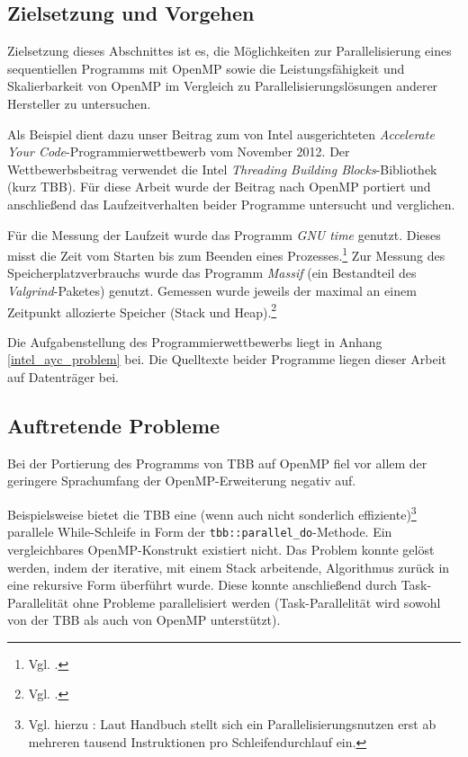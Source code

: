 \documentclass[11pt]{scrartcl}
\begin{document}
\subsection{Zielsetzung und Vorgehen}

Zielsetzung dieses Abschnittes ist es, die Möglichkeiten zur Parallelisierung eines sequentiellen Programms mit OpenMP
sowie die Leistungsfähigkeit und Skalierbarkeit von OpenMP im Vergleich zu Parallelisierungslösungen anderer Hersteller
zu untersuchen.

Als Beispiel dient dazu unser Beitrag zum von Intel ausgerichteten \emph{Accelerate Your Code}-Programmierwettbewerb vom
November 2012. Der Wettbewerbsbeitrag verwendet die Intel \emph{Threading Building Blocks}-Bibliothek (kurz TBB). Für
diese Arbeit wurde der Beitrag nach OpenMP portiert und anschließend das Laufzeitverhalten beider Programme untersucht
und verglichen.

Für die Messung der Laufzeit wurde das Programm \emph{GNU time} genutzt. Dieses misst die Zeit vom Starten bis zum Beenden eines Prozesses.\footnote{Vgl. \cite{time_man_2012}.}
Zur Messung des Speicherplatzverbrauchs wurde das Programm \emph{Massif} (ein Bestandteil des \emph{Valgrind}-Paketes) genutzt. Gemessen wurde jeweils der maximal an einem Zeitpunkt allozierte Speicher (Stack und Heap).\footnote{Vgl. \cite[S. 136ff.]{valgrind_2012}.}

Die Aufgabenstellung des Programmierwettbewerbs liegt in Anhang \ref{intel_ayc_problem} bei. Die Quelltexte beider
Programme liegen dieser Arbeit auf Datenträger bei.

\subsection{Auftretende Probleme}

Bei der Portierung des Programms von TBB auf OpenMP fiel vor allem der geringere Sprachumfang der OpenMP-Erweiterung
negativ auf.

Beispielsweise bietet die TBB eine (wenn auch nicht sonderlich effiziente)\footnote{Vgl. hierzu \cite{intel_cook_2012}:
Laut Handbuch stellt sich ein Parallelisierungsnutzen erst ab mehreren tausend Instruktionen pro Schleifendurchlauf
ein.} parallele While-Schleife in Form der \texttt{tbb::parallel\_do}-Methode. Ein vergleichbares OpenMP-Konstrukt
existiert nicht. Das Problem konnte gelöst werden, indem der iterative, mit einem Stack arbeitende, Algorithmus zurück
in eine rekursive Form überführt wurde. Diese konnte anschließend durch Task-Parallelität ohne Probleme parallelisiert
werden (Task-Parallelität wird sowohl von der TBB als auch von OpenMP unterstützt).
\end{document}
